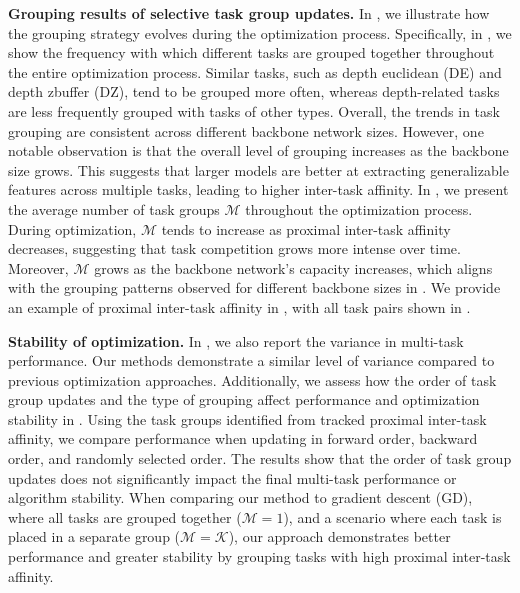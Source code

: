 \textbf{Grouping results of selective task group updates.} In , we illustrate how the grouping strategy evolves during the optimization process. Specifically, in , we show the frequency with which different tasks are grouped together throughout the entire optimization process. Similar tasks, such as depth euclidean (DE) and depth zbuffer (DZ), tend to be grouped more often, whereas depth-related tasks are less frequently grouped with tasks of other types. Overall, the trends in task grouping are consistent across different backbone network sizes. However, one notable observation is that the overall level of grouping increases as the backbone size grows. This suggests that larger models are better at extracting generalizable features across multiple tasks, leading to higher inter-task affinity. In , we present the average number of task groups $\mathcal{M}$ throughout the optimization process. During optimization, $\mathcal{M}$ tends to increase as proximal inter-task affinity decreases, suggesting that task competition grows more intense over time. Moreover, $\mathcal{M}$ grows as the backbone network's capacity increases, which aligns with the grouping patterns observed for different backbone sizes in . We provide an example of proximal inter-task affinity in , with all task pairs shown in .

\textbf{Stability of optimization.} In , we also report the variance in multi-task performance. Our methods demonstrate a similar level of variance compared to previous optimization approaches. Additionally, we assess how the order of task group updates and the type of grouping affect performance and optimization stability in . Using the task groups identified from tracked proximal inter-task affinity, we compare performance when updating in forward order, backward order, and randomly selected order. The results show that the order of task group updates does not significantly impact the final multi-task performance or algorithm stability. When comparing our method to gradient descent (GD), where all tasks are grouped together ($\mathcal{M}=1$), and a scenario where each task is placed in a separate group ($\mathcal{M}=\mathcal{K}$), our approach demonstrates better performance and greater stability by grouping tasks with high proximal inter-task affinity.


